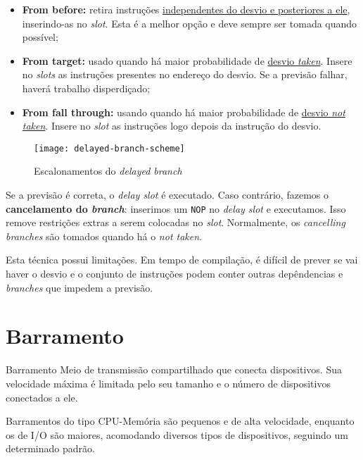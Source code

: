 \begin{itemize}
  \item \textbf{From before:} retira instruções \underline{independentes do desvio e posteriores a ele}, inserindo-as no \textit{slot}. Esta é a melhor opção e deve sempre ser tomada quando possível;

  \item \textbf{From target:} usado quando há maior probabilidade de \underline{desvio \textit{taken}}. Insere no \textit{slots} as instruções presentes no endereço do desvio. Se a previsão falhar, haverá trabalho disperdiçado;

  \item \textbf{From fall through:} usando quando há maior probabilidade de \underline{desvio \textit{not taken}}. Insere no \textit{slot} as instruções logo depois da instrução do desvio.
\end{itemize}

\begin{figure}
  \centering
  \texttt{[image: delayed-branch-scheme]}
  \label{fig:delayed-branch-scheme}
  \caption{Escalonamentos do \textit{delayed branch}}
\end{figure}

Se a previsão é correta, o \textit{delay slot} é executado. Caso contrário, fazemos o \textbf{cancelamento do \textit{branch}}: inserimos um \texttt{NOP} no \textit{delay slot} e executamos. Isso remove restrições extras a serem colocadas no \textit{slot}. Normalmente, os \textit{cancelling branches} são tomados quando há o \textit{not taken}.

Esta técnica possui limitações. Em tempo de compilação, é difícil de prever se vai haver o desvio e o conjunto de instruções podem conter outras depêndencias e \textit{branches} que impedem a previsão.




\section{Barramento}
\begin{definicao}{Barramento}
  Meio de transmissão compartilhado que conecta dispositivos. Sua velocidade máxima é limitada pelo seu tamanho e o número de dispositivos conectados a ele.
\end{definicao}

Barramentos do tipo CPU-Memória são pequenos e de alta velocidade, enquanto os de I/O são maiores, acomodando diversos tipos de dispositivos, seguindo um determinado padrão.

